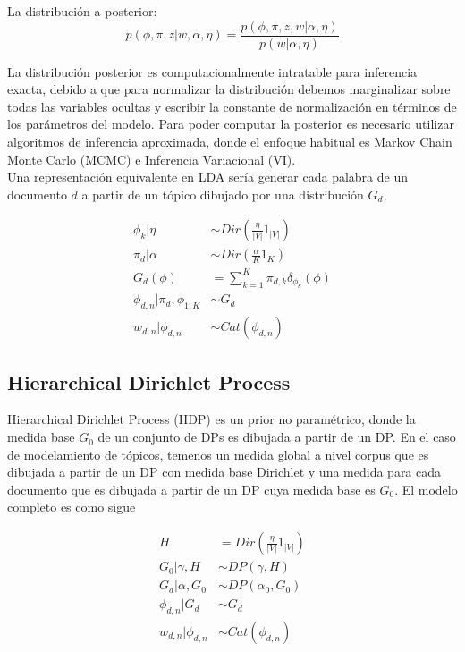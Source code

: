 \documentclass[letterpaper,12pt,oneside]{book} %
\begin{document}
La distribución a posterior:
\begin{equation}
    p(\phi, \pi, z|w, \alpha, \eta) = \frac{p(\phi, \pi, z, w|\alpha, \eta)}{p(w|\alpha, \eta)}
\end{equation}

La distribución posterior es computacionalmente intratable para inferencia exacta, debido a que para normalizar la distribución debemos marginalizar sobre todas las variables ocultas y escribir la constante de normalización en términos de los parámetros del modelo. Para poder computar la posterior es necesario utilizar algoritmos de inferencia aproximada, donde el enfoque habitual es Markov Chain Monte Carlo (MCMC) e Inferencia Variacional (VI).\\

Una representación equivalente en LDA sería generar cada palabra de un documento $d$ a partir de un tópico dibujado por una distribución $G_{d}$,

\begin{align}
    \phi_{k}|\eta & \sim Dir(\frac{\eta}{|V|}1_{|V|})\\
    \pi_{d}|\alpha & \sim Dir(\frac{\alpha}{K}1_{K})\\
    G_{d}(\phi)& =\sum_{k=1}^{K}\pi_{d, k}\delta_{\phi_{k}}(\phi)\\
    \phi_{d,n}|\pi_{d}, \phi_{1:K} & \sim G_{d}\\
    w_{d,n}|\phi_{d,n} & \sim Cat(\phi_{d,n})
\end{align}

\subsection{Hierarchical Dirichlet Process}
\label{sec:hdp}

Hierarchical Dirichlet Process (HDP)\citep{teh2005sharing} es un prior no paramétrico, donde la medida base $G_{0}$ de un conjunto de DPs es dibujada a partir de un DP. En el caso de modelamiento de tópicos, temenos un medida global a nivel corpus que es dibujada a partir de un DP con medida base Dirichlet y una medida para cada documento que es dibujada a partir de un DP cuya medida base es $G_{0}$. El modelo completo es como sigue

\begin{align}
   H &= Dir(\frac{\eta}{|V|}1_{|V|})\\
   G_{0}|\gamma, H &\sim DP(\gamma, H)\\
   G_{d}|\alpha, G_{0} &\sim DP(\alpha_{0}, G_{0})\\
   \phi_{d,n}|G_{d} &\sim G_{d}\\
   w_{d,n}|\phi_{d,n} &\sim Cat(\phi_{d,n})
\end{align}
\end{document}
